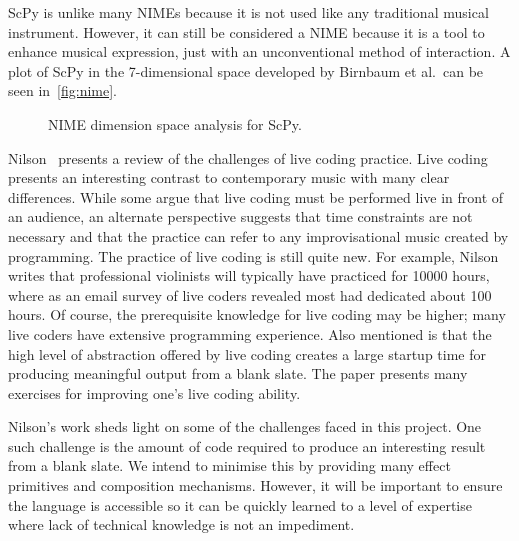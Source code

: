 \documentclass{article}
\begin{document}
ScPy is unlike many NIMEs because it is not used like any traditional musical instrument.
However, it can still be considered a NIME because it is a tool to enhance musical expression,
just with an unconventional method of interaction. A plot of ScPy in the 7-dimensional space
developed by Birnbaum et al.\ can be seen in~\autoref{fig:nime}.

\begin{figure}[ht]
    \caption{NIME dimension space analysis for ScPy.}\label{fig:nime}
    \begin{center}
    \end{center}
\end{figure}

Nilson~\cite{nilson2007live} presents a review of the challenges of live coding practice. Live
coding presents an interesting contrast to contemporary music with many clear differences.  While
some argue that live coding must be performed live in front of an audience, an alternate
perspective suggests that time constraints are not necessary and that the practice can refer to any
improvisational music created by programming. The practice of live coding is still quite new.
For example, Nilson writes that professional violinists will typically have practiced for 10000 hours, where
as an email survey of live coders revealed most had dedicated about 100 hours. Of course, the
prerequisite knowledge for live coding may be higher; many live coders have extensive programming
experience. Also mentioned is that the high level of abstraction offered by live coding creates a large
startup time for producing meaningful output from a blank slate. The paper presents many exercises
for improving one's live coding ability.

Nilson's work sheds light on some of the challenges faced in this project.
One such challenge is the amount of code required to produce an interesting result from a blank
slate. We intend to minimise this by providing many effect primitives and composition
mechanisms. However, it will be important to ensure the language is accessible so it can be
quickly learned to a level of expertise where lack of technical knowledge is not an impediment.
\end{document}
